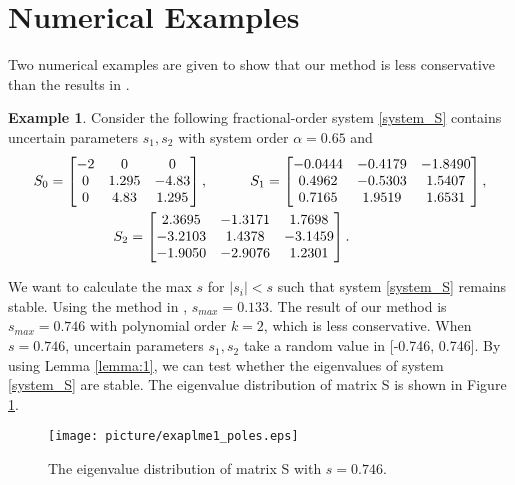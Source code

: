 \documentclass[]{interact}
\theoremstyle{plain}%
\theoremstyle{definition}
\newtheorem{example}[theorem]{Example}
\theoremstyle{remark}
\begin{document}
\section{Numerical Examples}                                                                             
Two numerical examples are given to show that our method is less conservative than the results in \cite{Chen2015, Far2011}.
\begin{example}
	Consider the following fractional-order system \eqref{system_S} contains uncertain parameters $s_1,s_2$ with system order $\alpha=0.65$ and
	\begin{equation} \label{example1_def}
	\begin{split}
	&S_0 = \begin{bmatrix}-2 & 0 & 0\\0  & 1.295 & -4.83\\ 0  & 4.83  & 1.295	\end{bmatrix}, \indent \indent  
	S_1 = \begin{bmatrix}-0.0444 &  -0.4179 &  -1.8490\\ 0.4962 &  -0.5303  &  1.5407\\ 0.7165  &  1.9519 &   1.6531 \end{bmatrix},   \\
	&\hspace{2cm}S_2 = \begin{bmatrix}  2.3695 &  -1.3171  &  1.7698 \\ -3.2103 &   1.4378  & -3.1459 \\ -1.9050 &  -2.9076  & 1.2301\end{bmatrix}. 
	\end{split}
	\end{equation}
	\par We want to calculate the max $s$ for $|s_i| < s$ such that system \eqref{system_S} remains stable. Using the method in \cite{Chen2015}, $s_{max} = 0.133$. The result of our method is $s_{max} = 0.746$ with polynomial order $k=2$, which is less conservative. When $s=0.746$, uncertain parameters $s_1, s_2$ take a random value in [-0.746, 0.746]. By using Lemma \ref{lemma:1}, we can test whether the eigenvalues of system \eqref{system_S} are stable. The eigenvalue distribution of matrix S is shown in Figure \ref{example1_poles}. 
	\begin{figure}[H]
		\centering
	    \texttt{[image: picture/exaplme1\_poles.eps]}
		\caption{The eigenvalue distribution of matrix S with $s=0.746$.} 
		\label{example1_poles} 
	\end{figure}

\end{example}
\end{document}
